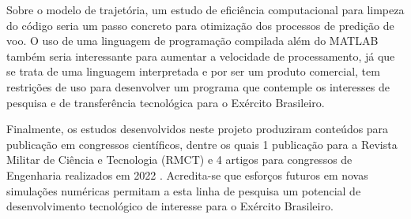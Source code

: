 Sobre o modelo de trajetória, um estudo de eficiência computacional para limpeza do código seria um passo concreto para otimização dos processos de predição de voo. O uso de uma linguagem de programação compilada além do MATLAB\textregistered{} também seria interessante para aumentar a velocidade de processamento, já que se trata de uma linguagem interpretada e por ser um produto comercial, tem restrições de uso para desenvolver um programa que contemple os interesses de pesquisa e de transferência tecnológica para o Exército Brasileiro.

Finalmente, os estudos desenvolvidos neste projeto produziram conteúdos para publicação em congressos científicos, dentre os quais 1 publicação para a Revista Militar de Ciência e Tecnologia (RMCT) e 4 artigos para congressos de Engenharia realizados em 2022 \cite{RosendoCBCFD2022,ThallyoENCIT2022,RosendoCONEM2022,BernardoCONEM2022,RosendoCILAMCE2022}. Acredita-se que esforços futuros em novas simulações numéricas permitam a esta linha de pesquisa um potencial de desenvolvimento tecnológico de interesse para o Exército Brasileiro. 